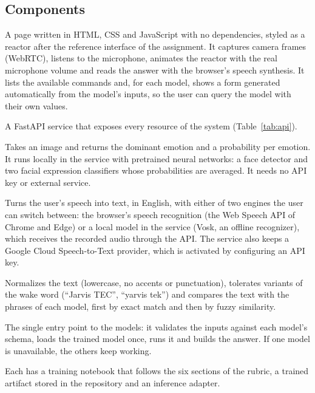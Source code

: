 \documentclass[11pt,letterpaper]{article}
\begin{document}
\subsection{Components}

\begin{description}[leftmargin=0.5cm]
\item[Web interface.] A page written in HTML, CSS and JavaScript with no dependencies, styled as a reactor after the reference interface of the assignment. It captures camera frames (WebRTC), listens to the microphone, animates the reactor with the real microphone volume and reads the answer with the browser's speech synthesis. It lists the available commands and, for each model, shows a form generated automatically from the model's inputs, so the user can query the model with their own values.
\item[REST API.] A FastAPI service that exposes every resource of the system (Table~\ref{tab:api}).
\item[Emotion agent.] Takes an image and returns the dominant emotion and a probability per emotion. It runs locally in the service with pretrained neural networks: a face detector and two facial expression classifiers whose probabilities are averaged. It needs no API key or external service.
\item[Speech agent.] Turns the user's speech into text, in English, with either of two engines the user can switch between: the browser's speech recognition (the Web Speech API of Chrome and Edge) or a local model in the service (Vosk, an offline recognizer), which receives the recorded audio through the API. The service also keeps a Google Cloud Speech-to-Text provider, which is activated by configuring an API key.
\item[Command router.] Normalizes the text (lowercase, no accents or punctuation), tolerates variants of the wake word (``Jarvis TEC'', ``yarvis tek'') and compares the text with the phrases of each model, first by exact match and then by fuzzy similarity.
\item[Model orchestrator.] The single entry point to the models: it validates the inputs against each model's schema, loads the trained model once, runs it and builds the answer. If one model is unavailable, the others keep working.
\item[Ten machine learning models.] Each has a training notebook that follows the six sections of the rubric, a trained artifact stored in the repository and an inference adapter.
\end{description}
\end{document}
